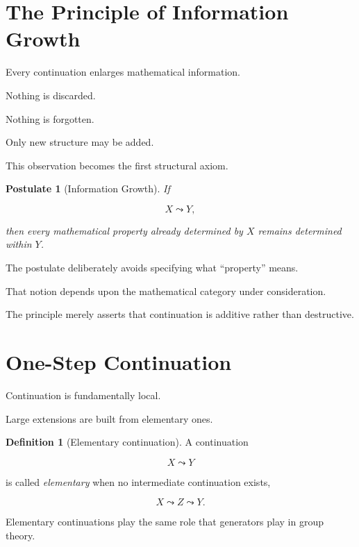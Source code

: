 \documentclass[13pt,openany]{book}
\theoremstyle{plain}
\newtheorem{postulate}{Postulate}[chapter]
\theoremstyle{definition}
\newtheorem{definition}{Definition}[chapter]
\begin{document}
\section{The Principle of Information Growth}

Every continuation enlarges mathematical information.

Nothing is discarded.

Nothing is forgotten.

Only new structure may be added.

This observation becomes the first structural axiom.

\begin{postulate}[Information Growth]
If

\[
X\leadsto Y,
\]

then every mathematical property already determined by \(X\) remains
determined within \(Y\).
\end{postulate}

The postulate deliberately avoids specifying what ``property'' means.

That notion depends upon the mathematical category under consideration.

The principle merely asserts that continuation is additive rather than
destructive.

\section{One-Step Continuation}

Continuation is fundamentally local.

Large extensions are built from elementary ones.

\begin{definition}[Elementary continuation]
A continuation

\[
X\leadsto Y
\]

is called \emph{elementary} when no intermediate continuation exists,

\[
X
\leadsto
Z
\leadsto
Y.
\]

\end{definition}

Elementary continuations play the same role that generators play in group
theory.
\end{document}
